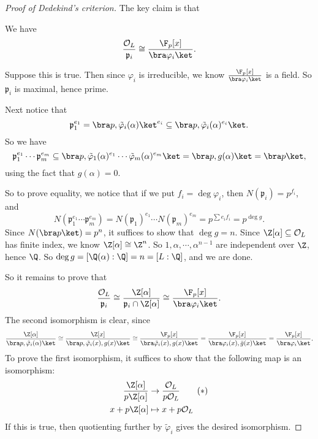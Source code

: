 \documentclass[a4paper]{article}
\begin{document}
\begin{proof}[Proof of Dedekind's criterion]
  The key claim is that
  \begin{claim}
    We have
    \[
      \frac{\mathcal{O}_L}{\mathfrak{p}_i} \cong \frac{\F_p[x]}{\bra \varphi_i\ket}.
    \]
  \end{claim}
  Suppose this is true. Then since $\varphi_i$ is irreducible, we know $\frac{\F_p[x]}{\bra \varphi_i\ket}$ is a field. So $\mathfrak{p}_i$ is maximal, hence prime.

  Next notice that
  \[
    \mathfrak{p}_1^{e_1} = \bra p, \tilde{\varphi}_i(\alpha)\ket^{e_i} \subseteq \bra p, \tilde{\varphi}_i(\alpha)^{e_i}\ket.
  \]
  So we have
  \[
    \mathfrak{p}_1^{e_1} \cdots \mathfrak{p}_m^{e_m} \subseteq \bra p, \tilde{\varphi}_1(\alpha)^{e_1} \cdots \tilde{\varphi}_m(\alpha)^{e_m}\ket = \bra p, g(\alpha)\ket = \bra p\ket,
  \]
  using the fact that $g(\alpha) = 0$.

  So to prove equality, we notice that if we put $f_i = \deg \varphi_i$, then $N(\mathfrak{p}_i) = p^{f_i}$, and
  \[
    N(\mathfrak{p}_1^{e_1} \cdots \mathfrak{p}_m^{e_m}) = N(\mathfrak{p}_1)^{e_1} \cdots N(\mathfrak{p}_m)^{e_m} = p^{\sum e_i f_i} = p^{\deg g}.
  \]
  Since $N(\bra p\ket) = p^n$, it suffices to show that $\deg g = n$. Since $\Z[\alpha] \subseteq \mathcal{O}_L$ has finite index, we know $\Z[\alpha] \cong \Z^n$. So $1,\alpha, \cdots, \alpha^{n - 1}$ are independent over $\Z$, hence $\Q$. So $\deg g = [\Q(\alpha):\Q] = n = [L:\Q]$, and we are done.

  So it remains to prove that
  \[
    \frac{\mathcal{O}_L}{\mathfrak{p}_i} \cong \frac{\Z[\alpha]}{\mathfrak{p}_i \cap \Z[\alpha]} \cong \frac{\F_p[x]}{\bra\varphi_i\ket}.
  \]
  The second isomorphism is clear, since
  \[
    \frac{\Z[\alpha]}{\bra p, \tilde{\varphi}_i(\alpha)\ket} \cong \frac{\Z[x]}{\bra p, \tilde{\varphi}_i(x), g(x)\ket} \cong \frac{\F_p[x]}{\bra \tilde{\varphi}_i(x), g(x)\ket} = \frac{\F_p[x]}{\bra \varphi_i(x), \bar{g}(x)\ket} = \frac{\F_p[x]}{\bra \varphi_i\ket}.
  \]
  To prove the first isomorphism, it suffices to show that the following map is an isomorphism:
  \begin{align*}
    \frac{\Z[\alpha]}{p\Z[\alpha]} &\to \frac{\mathcal{O}_L}{p\mathcal{O}_L}\tag{$*$}\\
    x + p\Z[\alpha] &\mapsto x + p \mathcal{O}_L
  \end{align*}
  If this is true, then quotienting further by $\tilde{\varphi}_i$ gives the desired isomorphism.


\end{proof}
\end{document}
